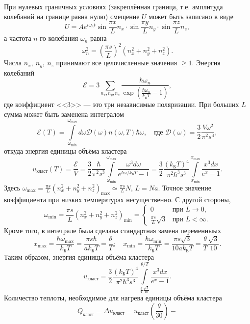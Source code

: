\documentclass[a4paper]{article}
\begin{document}
\begin{sol}
	При нулевых граничных условиях (закреплённая
	граница, т.\:е. амплитуда колебаний на
	границе равна нулю) смещение $U$ может
	быть записано в виде
	\[
	U= A e^{i \omega_n t} \sin 
	\frac{\pi x}{L} n_x \cdot \sin \frac{\pi y}{
	L} n_y \cdot \sin \frac{\pi z}{L} n_z
	,\]
	а частота $n$-го колебания $\omega_n$ 
	равна
	\[
		\omega_n^2 = \left( 
		\frac{\pi s}{L}\right) ^2
		\left( n_x^2 +n_y^2 +n_z^2 \right) 
	.\] 
	Числа $n_x,\ n_y,\ n_z$ принимают все целочисленные значения $\ge 1$. Энергия колебаний
	\[
		\mathcal{E}=3
		\sum_{n_x,n_y,n_z}^{} \frac{
		\hbar  \omega_n}{\exp \left( 
	\frac{\hbar  \omega_n }{k_\text{Б} T}-1\right) }
	,\] 
	где коэффициент  <<3>> --- это три
	независимые поляризации. При больших
	$L$ сумма может быть заменена интегралом
	\[
		\mathcal{E}(T)=
		\int\limits_{\omega_{\min}}^{\omega_{\max}} d\omega \mathcal{D} (\omega) n(\omega, T)
		\hbar  \omega,\quad
		\text{где }  \mathcal{D}(\omega)=
		\frac{3}{2} \frac{V \omega^2}{\pi^2 s^3}
	,\]
	откуда энергия единицы объёма кластера
	\[
		u_{\text{класт}}(T)=
		\frac{\mathcal{E}}{V}=
		\frac{3}{2} \frac{\hbar }{\pi
		^2 s^3} \int\limits_{\omega_{\min}}^{\omega_{\max}} \frac{\omega^3 d \omega}{e^{\hbar \omega /k_\text{Б} T}-1}= \frac{3}{2}
		\frac{(k_\text{Б}T)^4}{\pi
		^2 \hbar ^3 s^3}
		\int\limits_{x_{\min}}^{x_{\max}} 
		\frac{x^3 dx}{e^x-1}
	.\] 
	Здесь $\omega_{\max}= \frac{\pi s}{L}\left( 
	n_x^2 +n_y^2 +n_z^2\right) _{\max}\simeq
	\frac{\pi s}{L}N$, $L=Na$. Точное
	значение коэффициента при низких температурах
	несущественно.
	С другой стороны,
	\[
		\omega_{\min}= \frac{\pi s}{L} \left( 
		n_x^2+n_y^2+n_z^2\right) _{\min}=
		\begin{cases}
			0 & \text{при } L\to 0,\\
			\frac{\pi s}{L}\sqrt{3} &
			\text{при } L<\infty.
		\end{cases}
	\] 
	Кроме того, в интеграле была сделана стандартная замена переменныых
	\[
	x_{\max}= \frac{\hbar  \omega_{\max}}{k_\text{Б}T}= \frac{\pi s \hbar }{a k_\text{Б}T}=
	\frac{\theta}{T};\quad
	x_{\min}= \frac{\hbar \omega_{\min}}{k_\text{Б}T}= \frac{\pi s \sqrt{3} }{10a k_\text{Б}T}=
	\frac{\theta}{T} \frac{\sqrt{3} }{10}
	.\] 
Таким образом, энергия единицы объёма кластера
\[
	u_{\text{класт}}= \frac{3}{2} \frac{\left( 
	k_\text{Б}T\right) ^4}{\pi^2 \hbar ^3
s^3} \int\limits_{\frac{\theta}{T}\frac{\sqrt{3} }{10}}^{\theta /T} \frac{x^3 dx}{e^x-1} 
.\] 
Количество теплоты, необходимое для нагрева единицы
объёма кластера
\[
Q_{\text{класт}}= \Delta u_{\text{класт}}=
u_{\text{класт}} \left( \frac{\theta}{30} \right) -
\]
\end{sol}
\end{document}
